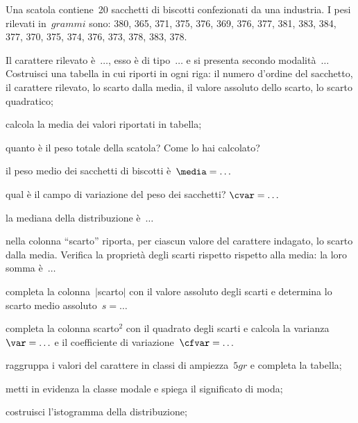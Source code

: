 \begin{esercizio}
\label{ese:A.46}
Una scatola contiene~20 sacchetti di biscotti confezionati da una 
industria. I pesi rilevati in~$\unit{grammi}$ sono:
380, 365, 371, 375, 376, 369, 376, 377, 381, 383, 384, 377, 370, 375, 374, 
376, 373, 378, 383, 378.
\begin{enumeratea}
 \item Il carattere rilevato è~$\ldots$, esso è di tipo~$\ldots$ e si 
presenta secondo modalità~$\ldots$
 Costruisci una tabella in cui riporti in ogni riga:
 il numero d'ordine del sacchetto, il carattere rilevato,
 lo scarto dalla media, il valore assoluto dello scarto, 
 lo scarto quadratico;
 \item calcola la media dei valori riportati in tabella;
 \item quanto è il peso totale della scatola? Come lo hai calcolato?
 \item il peso medio dei sacchetti di biscotti è~$\media = \ldots$
 \item qual è il campo di variazione del peso dei sacchetti? $\cvar = 
\ldots$
 \item la mediana della distribuzione è~$\ldots$
 \item nella colonna ``scarto'' riporta, per ciascun valore del carattere 
indagato, lo scarto dalla media.
 Verifica la proprietà degli scarti rispetto rispetto alla media: la loro 
somma è~$\ldots$
 \item completa la colonna~$\vert$scarto$\vert$ con il valore assoluto 
degli scarti e determina lo scarto medio assoluto~$s = \dots$
 \item completa la colonna scarto$^2$ con il quadrato degli scarti e 
calcola la varianza~$\var = \ldots$ e
 il coefficiente di variazione~$\cfvar = \ldots$
 \item raggruppa i valori del carattere in classi di ampiezza~$5 \unit{gr}$ 
e completa la tabella;
 \item metti in evidenza la classe modale e spiega il significato di moda;
 \item costruisci l'istogramma della distribuzione;


\end{enumeratea}
\end{esercizio}

